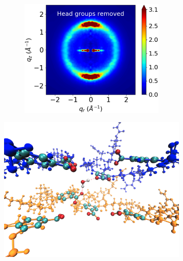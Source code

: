 \documentclass[journal=jpcbfk,manuscript=article]{achemso}
\begin{document}
  \begin{figure}[!htb]
  \begin{subfigure}{0.45\textwidth}
  \centering
  \begin{subfigure}{\textwidth}
  \includegraphics[width=\textwidth]{nophenyls_rzplot.pdf}
  \end{subfigure}
  \caption{}\label{fig:rdouble_nophenyls}
  \end{subfigure}
  \begin{subfigure}{0.45\textwidth}
  \centering
  \includegraphics[width=\textwidth]{hbonds_tails.pdf}

\end{subfigure}
\end{figure}
\end{document}
